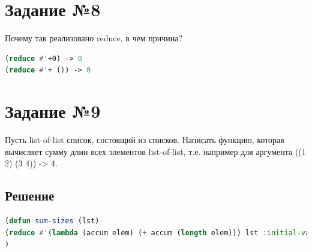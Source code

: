 \documentclass[12pt]{report}
\begin{document}
\section*{Задание №8}
Почему так реализовано reduce, в чем причина?
\begin{lstlisting}[label=5,caption=Решение задания №5, language=lisp]
(reduce #'+0) -> 0 
(reduce #'+ ()) -> 0
\end{lstlisting}

\section*{Задание №9}
Пусть list-of-list список, состоящий из списков. Написать функцию, которая вычисляет сумму длин всех элементов list-of-list, т.е. например для аргумента ((1 2) (3 4)) -> 4.
\subsection*{Решение}
\begin{lstlisting}[label=5,caption=Решение задания №5, language=lisp]
(defun sum-sizes (lst) 
(reduce #'(lambda (accum elem) (+ accum (length elem))) lst :initial-value 0)
)

\end{lstlisting}	
	
\end{document}
